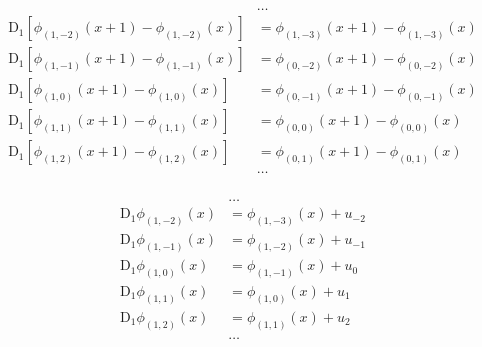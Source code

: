 \begin{equation*} \begin{aligned}
&\ldots \\
\mathrm{D}_1 \left[\phi_{(1,-2)}(x + 1) - \phi_{(1,-2)}(x) \right] &= \phi_{(1,-3)}(x + 1) - \phi_{(1,-3)}(x)
\\
\mathrm{D}_1 \left[\phi_{(1,-1)}(x + 1) - \phi_{(1,-1)}(x) \right] &= \phi_{(0,-2)}(x + 1) - \phi_{(0,-2)}(x)  
\\
\mathrm{D}_1 \left[\phi_{(1,0)}(x + 1) - \phi_{(1,0)}(x) \right] &= \phi_{(0,-1)}(x + 1) - \phi_{(0,-1)}(x)  
\\
\mathrm{D}_1 \left[\phi_{(1,1)}(x + 1) - \phi_{(1,1)}(x) \right] &= \phi_{(0,0)}(x + 1) - \phi_{(0,0)}(x)  
\\
\mathrm{D}_1 \left[\phi_{(1,2)}(x + 1) - \phi_{(1,2)}(x) \right] &= \phi_{(0,1)}(x + 1) - \phi_{(0,1)}(x)  
\\
&\ldots \\
\end{aligned} \end{equation*}

\begin{equation*} \begin{aligned}
&\ldots
\\
\mathrm{D}_1 \phi_{(1,-2)}(x) &= \phi_{(1,-3)}(x) + u_{-2}  
\\
\mathrm{D}_1 \phi_{(1,-1)}(x) &= \phi_{(1,-2)}(x) + u_{-1}  
\\
\mathrm{D}_1 \phi_{(1,0)}(x) &= \phi_{(1,-1)}(x) + u_0  
\\
\mathrm{D}_1 \phi_{(1,1)}(x) &= \phi_{(1,0)}(x) + u_1 
\\
\mathrm{D}_1 \phi_{(1,2)}(x) &= \phi_{(1,1)}(x) + u_2 
\\
&\ldots
\\
\end{aligned} \end{equation*}
